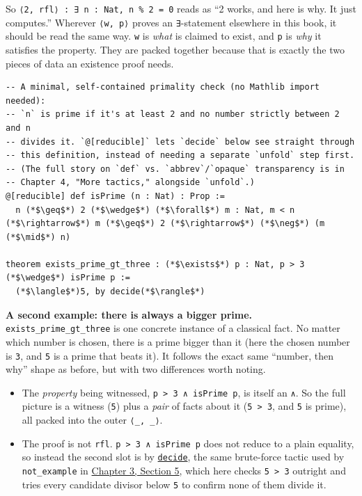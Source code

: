 So \texttt{⟨2, rfl⟩ : ∃ n : Nat, n \% 2 = 0} reads as ``2 works, and here is why. It just computes.'' Wherever \texttt{⟨w, p⟩} proves an \texttt{∃}-statement elsewhere in this book, it should be read the same way. \texttt{w} is \emph{what} is claimed to exist, and \texttt{p} is \emph{why} it satisfies the property. They are packed together because that is exactly the two pieces of data an existence proof needs.

\begin{lstlisting}
-- A minimal, self-contained primality check (no Mathlib import needed):
-- `n` is prime if it's at least 2 and no number strictly between 2 and n
-- divides it. `@[reducible]` lets `decide` below see straight through
-- this definition, instead of needing a separate `unfold` step first.
-- (The full story on `def` vs. `abbrev`/`opaque` transparency is in
-- Chapter 4, "More tactics," alongside `unfold`.)
@[reducible] def isPrime (n : Nat) : Prop :=
  n (*$\geq$*) 2 (*$\wedge$*) (*$\forall$*) m : Nat, m < n (*$\rightarrow$*) m (*$\geq$*) 2 (*$\rightarrow$*) (*$\neg$*) (m (*$\mid$*) n)

theorem exists_prime_gt_three : (*$\exists$*) p : Nat, p > 3 (*$\wedge$*) isPrime p :=
  (*$\langle$*)5, by decide(*$\rangle$*)
\end{lstlisting}

\textbf{A second example: there is always a bigger prime.} \texttt{exists\_\allowbreak{}prime\_\allowbreak{}gt\_\allowbreak{}three} is one concrete instance of a classical fact. No matter which number is chosen, there is a prime bigger than it (here the chosen number is \texttt{3}, and \texttt{5} is a prime that beats it). It follows the exact same ``number, then why'' shape as before, but with two differences worth noting.

\begin{itemize}
\tightlist
\item
  The \emph{property} being witnessed, \texttt{p > 3 ∧ isPrime p}, is itself an \texttt{∧}. So the full picture is a witness (\texttt{5}) plus a \emph{pair} of facts about it (\texttt{5 > 3}, and \texttt{5} is prime), all packed into the outer \texttt{⟨\_\allowbreak{}, \_\allowbreak{}⟩}.
\item
  The proof is not \texttt{rfl}. \texttt{p > 3 ∧ isPrime p} does not reduce to a plain equality, so instead the second slot is by \href{https://lean-lang.org/doc/reference/latest/Tactic-Proofs/Tactic-Reference/}{\texttt{decide}}, the same brute-force tactic used by \texttt{not\_\allowbreak{}example} in \hyperref[sec:03-propositions-and-proofs:05-and-or-not:1]{Chapter 3, Section 5}, which here checks \texttt{5 > 3} outright and tries every candidate divisor below \texttt{5} to confirm none of them divide it.
\end{itemize}

